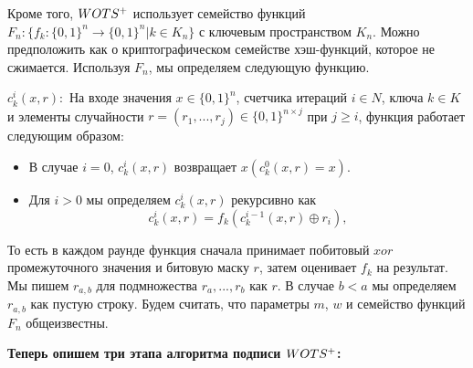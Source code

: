 \documentclass[a4paper, 14pt]{extarticle}
\begin{document}
Кроме того, $W\-OTS^{+}$ использует семейство функций $F_{n} : \{f_{k} : \{0, 1\}^{n} \rightarrow \{0, 1\}^{n}|k \in K_{n}\}$ с ключевым пространством $K_{n}$. Можно предположить как о криптографическом семействе хэш-функций, которое не сжимается. Используя $F_{n}$, мы определяем следующую функцию.

$c^{i}_{k}(x, r):$ На входе значения $x \in \{0, 1\}^{n}$, счетчика итераций $i \in N$, ключа $k \in K$ и элементы случайности $r = (r_{1}, ..., r_{j}) \in \{0, 1\}^{n \times j}$ при $j \geq i$, функция работает следующим образом:

\begin{itemize}
    \item В случае $i = 0$, $c^{i}_{k}(x, r)$ возвращает $x(c^{0}_{k}(x, r) = x)$.
    \item Для $i > 0$ мы определяем $c^{i}_{k}(x, r)$ рекурсивно как
    \[ c^{i}_{k}(x, r) = f_{k}(c^{i - 1}_{k}(x, r) \oplus r_{i}) ,\]
\end{itemize}

То есть в каждом раунде функция сначала принимает побитовый $xor$ промежуточного значения и битовую маску $r$, затем оценивает $f_{k}$ на результат. Мы пишем $r_{a,b}$ для подмножества $r_{a}, ..., r_{b}$ как $r$. В случае $b < a$ мы определяем $r_{a,b}$ как пустую строку. Будем считать, что параметры $m$, $w$ и семейство функций $F_{n}$ общеизвестны.

\textbf{Теперь опишем три этапа алгоритма подписи $W\-OTS^{+}$:}
\end{document}
